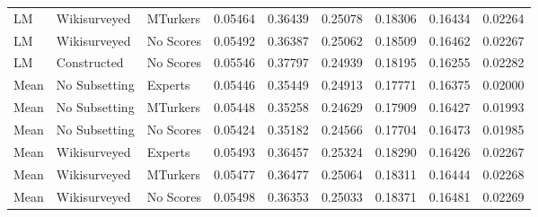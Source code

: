 \begin{table}[ht]
\begin{tabular}{lllrrrrrr}
  LM & Wikisurveyed & MTurkers & 0.05464 & 0.36439 & 0.25078 & 0.18306 & 0.16434 & 0.02264 \\ 
  LM & Wikisurveyed & No Scores & 0.05492 & 0.36387 & 0.25062 & 0.18509 & 0.16462 & 0.02267 \\ 
  LM & Constructed & No Scores & 0.05546 & 0.37797 & 0.24939 & 0.18195 & 0.16255 & 0.02282 \\ 
  Mean & No Subsetting & Experts & 0.05446 & 0.35449 & 0.24913 & 0.17771 & 0.16375 & 0.02000 \\ 
  Mean & No Subsetting & MTurkers & 0.05448 & 0.35258 & 0.24629 & 0.17909 & 0.16427 & 0.01993 \\ 
  Mean & No Subsetting & No Scores & 0.05424 & 0.35182 & 0.24566 & 0.17704 & 0.16473 & 0.01985 \\ 
  Mean & Wikisurveyed & Experts & 0.05493 & 0.36457 & 0.25324 & 0.18290 & 0.16426 & 0.02267 \\ 
  Mean & Wikisurveyed & MTurkers & 0.05477 & 0.36477 & 0.25064 & 0.18311 & 0.16444 & 0.02268 \\ 
  Mean & Wikisurveyed & No Scores & 0.05498 & 0.36353 & 0.25033 & 0.18371 & 0.16481 & 0.02269 \\ 
   \bottomrule
\end{tabular}
\end{table}
